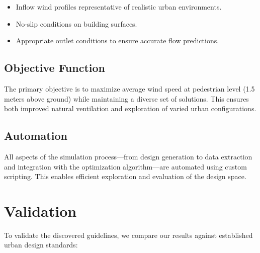 \documentclass[times,final]{elsarticle}
\begin{document}
\begin{itemize}
\item
  Inflow wind profiles representative of realistic urban environments.
\item
  No-slip conditions on building surfaces.
\item
  Appropriate outlet conditions to ensure accurate flow predictions.
\end{itemize}


\subsection{Objective Function}

The primary objective is to maximize average wind speed at pedestrian
level (1.5 meters above ground) while maintaining a diverse set of
solutions. This ensures both improved natural ventilation and
exploration of varied urban configurations.


\subsection{Automation}

All aspects of the simulation process---from design generation to data
extraction and integration with the optimization algorithm---are
automated using custom scripting. This enables efficient exploration and
evaluation of the design space.


\section{Validation}

To validate the discovered guidelines, we compare our results against
established urban design standards:
\end{document}
